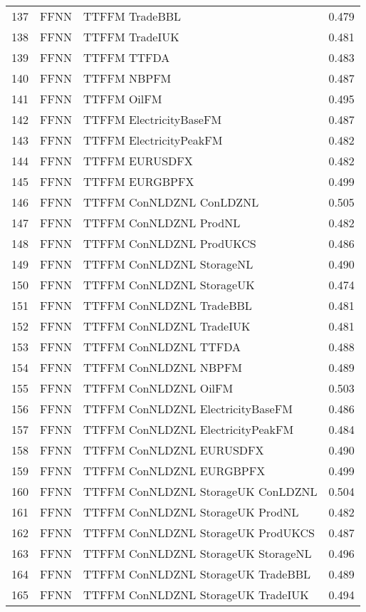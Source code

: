 \begin{table}[ht]
\begin{tabular}{rllr}
  137 & FFNN & TTFFM TradeBBL & 0.479 \\ 
  138 & FFNN & TTFFM TradeIUK & 0.481 \\ 
  139 & FFNN & TTFFM TTFDA & 0.483 \\ 
  140 & FFNN & TTFFM NBPFM & 0.487 \\ 
  141 & FFNN & TTFFM OilFM & 0.495 \\ 
  142 & FFNN & TTFFM ElectricityBaseFM & 0.487 \\ 
  143 & FFNN & TTFFM ElectricityPeakFM & 0.482 \\ 
  144 & FFNN & TTFFM EURUSDFX & 0.482 \\ 
  145 & FFNN & TTFFM EURGBPFX & 0.499 \\ 
  146 & FFNN & TTFFM ConNLDZNL ConLDZNL & 0.505 \\ 
  147 & FFNN & TTFFM ConNLDZNL ProdNL & 0.482 \\ 
  148 & FFNN & TTFFM ConNLDZNL ProdUKCS & 0.486 \\ 
  149 & FFNN & TTFFM ConNLDZNL StorageNL & 0.490 \\ 
  150 & FFNN & TTFFM ConNLDZNL StorageUK & 0.474 \\ 
  151 & FFNN & TTFFM ConNLDZNL TradeBBL & 0.481 \\ 
  152 & FFNN & TTFFM ConNLDZNL TradeIUK & 0.481 \\ 
  153 & FFNN & TTFFM ConNLDZNL TTFDA & 0.488 \\ 
  154 & FFNN & TTFFM ConNLDZNL NBPFM & 0.489 \\ 
  155 & FFNN & TTFFM ConNLDZNL OilFM & 0.503 \\ 
  156 & FFNN & TTFFM ConNLDZNL ElectricityBaseFM & 0.486 \\ 
  157 & FFNN & TTFFM ConNLDZNL ElectricityPeakFM & 0.484 \\ 
  158 & FFNN & TTFFM ConNLDZNL EURUSDFX & 0.490 \\ 
  159 & FFNN & TTFFM ConNLDZNL EURGBPFX & 0.499 \\ 
  160 & FFNN & TTFFM ConNLDZNL StorageUK ConLDZNL & 0.504 \\ 
  161 & FFNN & TTFFM ConNLDZNL StorageUK ProdNL & 0.482 \\ 
  162 & FFNN & TTFFM ConNLDZNL StorageUK ProdUKCS & 0.487 \\ 
  163 & FFNN & TTFFM ConNLDZNL StorageUK StorageNL & 0.496 \\ 
  164 & FFNN & TTFFM ConNLDZNL StorageUK TradeBBL & 0.489 \\ 
  165 & FFNN & TTFFM ConNLDZNL StorageUK TradeIUK & 0.494 \\ 

\end{tabular}
\end{table}
